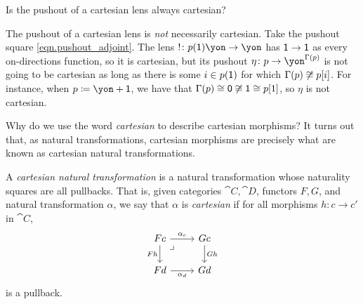 \documentclass[Book-Poly]{subfiles}
\begin{document}
\begin{exercise}
Is the pushout of a cartesian lens always cartesian?
\begin{solution}
The pushout of a cartesian lens is \emph{not} necessarily cartesian.
Take the pushout square \eqref{eqn.pushout_adjoint}.
The lens $!\colon p(\1)\yon\to\yon$ has $\textsf{1}\to\textsf{1}$ as every on-directions function, so it is cartesian, but its pushout $\eta\colon p\to\yon^{\Gamma(p)}$ is not going to be cartesian as long as there is some $i\in p(\textsf{1})$ for which $\Gamma(p)\not\cong p[i]$.
For instance, when $p\coloneqq\yon+\1$, we have that $\Gamma(p)\cong\textsf{0}\not\cong\textsf{1}\cong p[1]$, so $\eta$ is not cartesian.
\end{solution}
\end{exercise}

Why do we use the word \emph{cartesian} to describe cartesian morphisms? It turns out that, as natural transformations, cartesian morphisms are precisely what are known as cartesian natural transformations.

\begin{definition} \label{def.cart_nat_trans}
A \emph{cartesian natural transformation} is a natural transformation whose naturality squares are all pullbacks.
That is, given categories $\cat{C},\cat{D}$, functors $F,G$, and natural transformation $\alpha$, we say that $\alpha$ is \emph{cartesian} if for all morphisms $h\colon c\to c'$ in $\cat{C}$,
\[
\begin{tikzcd}
    Fc \ar[d, "Fh"'] \ar[r, "\alpha_c"] & Gc \ar[d, "Gh"] \\
    Fd \ar[r, "\alpha_d"'] & Gd \ar[ul, phantom, very near end, "\lrcorner"]
\end{tikzcd}
\]
is a pullback.
\end{definition}
\end{document}
